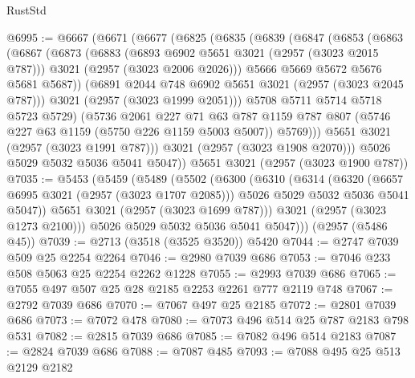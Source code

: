 \begin{lexlean}{RustStd}
\begin{coremodule}
@6995 := @6667
    (@6671
      (@6677
        (@6825
          (@6835
            (@6839
              (@6847
                (@6853
                  (@6863
                    (@6867
                      (@6873
                        (@6883
                          (@6893 @6902 @5651 @3021 (@2957 (@3023 @2015 @787)))
                          @3021
                          (@2957 (@3023 @2006 @2026)))
                        @5666
                        @5669
                        @5672
                        @5676
                        @5681
                        @5687))
                    (@6891 @2044 @748 @6902 @5651 @3021 (@2957 (@3023 @2045 @787)))
                    @3021
                    (@2957 (@3023 @1999 @2051)))
                  @5708
                  @5711
                  @5714
                  @5718
                  @5723
                  @5729)
                (@5736
                  @2061
                  @227
                  @71
                  @63
                  @787
                  @1159
                  @787
                  @807
                  (@5746 @227 @63 @1159 (@5750 @226 @1159 @5003 @5007))
                  @5769)))
            @5651
            @3021
            (@2957 (@3023 @1991 @787)))
          @3021
          (@2957 (@3023 @1908 @2070)))
        @5026
        @5029
        @5032
        @5036
        @5041
        @5047))
    @5651
    @3021
    (@2957 (@3023 @1900 @787))
@7035 := @5453
    (@5459
      (@5489
        (@5502
          (@6300
            (@6310
              (@6314
                (@6320
                  (@6657 @6995 @3021 (@2957 (@3023 @1707 @2085)))
                  @5026
                  @5029
                  @5032
                  @5036
                  @5041
                  @5047))
              @5651
              @3021
              (@2957 (@3023 @1699 @787)))
            @3021
            (@2957 (@3023 @1273 @2100)))
          @5026
          @5029
          @5032
          @5036
          @5041
          @5047)))
    (@2957 (@5486 @45))
@7039 := @2713 (@3518 (@3525 @3520)) @5420
@7044 := @2747 @7039 @509 @25 @2254 @2264
@7046 := @2980 @7039 @686
@7053 := @7046 @233 @508 @5063 @25 @2254 @2262 @1228
@7055 := @2993 @7039 @686
@7065 := @7055 @497 @507 @25 @28 @2185 @2253 @2261 @777 @2119 @748
@7067 := @2792 @7039 @686
@7070 := @7067 @497 @25 @2185
@7072 := @2801 @7039 @686
@7073 := @7072 @478
@7080 := @7073 @496 @514 @25 @787 @2183 @798 @531
@7082 := @2815 @7039 @686
@7085 := @7082 @496 @514 @2183
@7087 := @2824 @7039 @686
@7088 := @7087 @485
@7093 := @7088 @495 @25 @513 @2129 @2182

\end{coremodule}
\end{lexlean}
